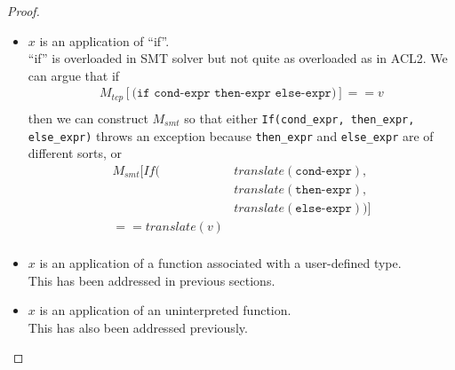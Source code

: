 \begin{proof}
\begin{itemize}
\begin{itemize}
\begin{lstlisting}
        (defun e () (e-iter (i-large-integer)))
      \end{lstlisting}
      However, in $G_{smt}$, we only have five operators plus, times, negate, and
      reciprocal. Functions such as \texttt{e-iter} as written above can be
      expanded a fixed number of times and then approximated with uninterpreted
      functions. This creates terms with the four operators and calls to
      uninterpreted function. Thus, if $M_{tcp}$ assigns a transcendental number
      to a term, $M_{smt}$ can assign a ``good enough'' algebraic number to
      produce a model of $G_{smt}$. 
    \item $x$ is an application of ``if''. \\
      ``if'' is overloaded in SMT solver but not quite as overloaded as in ACL2.
      We can argue that if
      \begin{align*}
      M_{tcp}[\texttt{(if cond-expr then-expr else-expr)}] == v \\
      \end{align*}
      then we can construct $M_{smt}$ so that either \texttt{If(cond\_expr,
        then\_expr, else\_expr)} throws an exception because \texttt{then\_expr}
      and \texttt{else\_expr} are of different sorts, or
      \begin{align*}
        M_{smt}[If(&translate(\texttt{cond-expr}), \\
                  &translate(\texttt{then-expr}), \\
                  &translate(\texttt{else-expr}))] \\
        == translate(v) \\
      \end{align*}
                                                   
    \item $x$ is an application of a function associated with a user-defined
      type. \\
      This has been addressed in previous sections.
    \item $x$ is an application of an uninterpreted function. \\
      This has also been addressed previously.
    \end{itemize}
  \end{itemize}
\end{proof}


